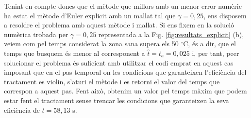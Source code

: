 \documentclass[11pt]{article}
\begin{document}
Tenint en compte doncs que el mètode que millors amb un menor error numèric ha estat el mètode d'Euler explicit amb un mallat tal que $\gamma=0,25$, ens disposem a resoldre el problema amb aquest mètode i mallat. Si ens fixem en la solució numèrica trobada per $\gamma=0,25$ representada a la Fig. \ref{fig:resultats_explicit} (b), veiem com pel temps considerat la zona sana supera els 50 $^\circ$C, és a dir, que el temps que busquem és menor al corresponent a $\hat{t}=t_a=0,025$ i, per tant, peer solucionar el problema és suficient amb utilitzar el codi emprat en aquest cas imposant que en el pas temporal on les condicions que garanteixen l'eficiència del tractament es violin, s'aturi el mètode i es retorni el valor del temps que correspon a aquest pas. Fent això, obtenim un valor pel temps màxim que podem estar fent el tractament sense trencar les condicions que garanteixen la seva eficiència de $t=58,13$ s.
\end{document}
